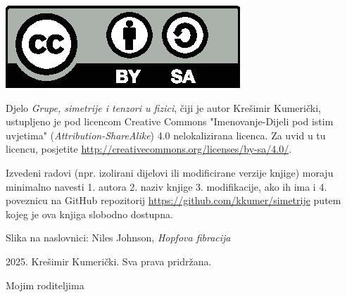 
\thispagestyle{empty}

\vspace*{20em}


\centerline{\includegraphics[scale=1.0,clip]{pics/by-sa.eps}}
Djelo \emph{Grupe, simetrije i tenzori u fizici}, čiji je autor Krešimir
Kumerički, ustupljeno je pod licencom Creative Commons 
"Imenovanje-Dijeli pod istim uvjetima" (\emph{Attribution-ShareAlike}) 
4.0 nelokalizirana licenca. Za uvid u tu licencu, posjetite
\url{http://creativecommons.org/licenses/by-sa/4.0/}.

Izvedeni radovi (npr. izolirani dijelovi ili modificirane verzije knjige) moraju minimalno
navesti 1. autora 2. naziv knjige 3. modifikacije, ako ih ima i
4. poveznicu na GitHub repozitorij
\url{https://github.com/kkumer/simetrije} putem kojeg je ova knjiga
slobodno dostupna.

\vspace*{5em}
Slika na naslovnici: Niles Johnson, \emph{Hopfova fibracija}

\vspace*{5em}
\textcopyright{} 2025. Krešimir Kumerički. Sva prava pridržana.

\cleardoublepage
\thispagestyle{empty}
\vspace*{20em}
\begin{flushright}
Mojim roditeljima
\end{flushright}
\cleardoublepage
